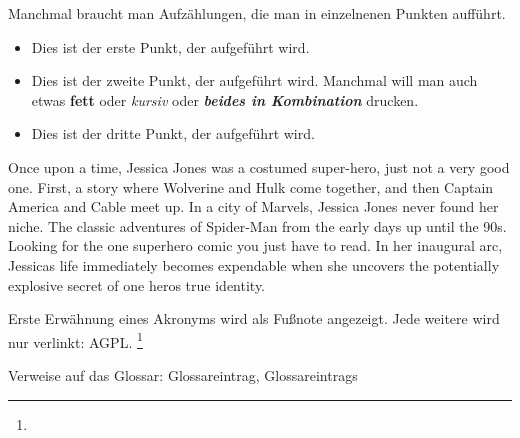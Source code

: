 Manchmal braucht man Aufzählungen, die man in einzelnenen Punkten aufführt.
\begin{itemize}
\item Dies ist der erste Punkt, der aufgeführt wird.
\item Dies ist der zweite Punkt, der aufgeführt wird. Manchmal will man auch etwas \textbf{fett} oder \textit{kursiv} oder \textbf{\textit{beides in Kombination}}  drucken.
\item Dies ist der dritte Punkt, der aufgeführt wird.
\end{itemize}

Once upon a time, Jessica Jones was a costumed super-hero, just not a very good one. First, a story where Wolverine and Hulk come together, and then Captain America and Cable meet up. In a city of Marvels, Jessica Jones never found her niche. The classic adventures of Spider-Man from the early days up until the 90s. Looking for the one superhero comic you just have to read. In her inaugural arc, Jessicas life immediately becomes expendable when she uncovers the potentially explosive secret of one heros true identity.

Erste Erwähnung eines Akronyms wird als Fußnote angezeigt. Jede weitere wird
nur verlinkt: \acf{AGPL}. \footnote{}

Verweise auf das Glossar: \gls{Glossareintrag}, \glspl{Glossareintrag}

